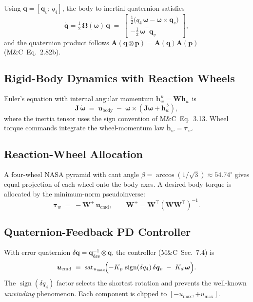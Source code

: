 Using \(\bm{q}=[\bm{q}_v;\,q_4]\), the body-to-inertial quaternion satisfies
\begin{equation}
\dot{\bm{q}} = \tfrac{1}{2}\,\bm{\Omega}(\bm{\omega})\,\bm{q}
\;=\;
\begin{bmatrix}
 \tfrac{1}{2}\bigl(q_4\,\bm{\omega} - \bm{\omega}\times\bm{q}_v\bigr) \\
-\tfrac{1}{2}\,\bm{\omega}^{\!\top}\bm{q}_v
\end{bmatrix},
\tag{M\&C Eq.~2.88}
\end{equation}
and the quaternion product follows
\(\bm{A}(\bm{q}\otimes\bm{p}) = \bm{A}(\bm{q})\bm{A}(\bm{p})\)
(M\&C~Eq.~2.82b).

\subsection{Rigid-Body Dynamics with Reaction Wheels}

Euler's equation with internal angular momentum
\(\bm{h}_w^{\,b} = \bm{W}\bm{h}_w\) is
\begin{equation}
\bm{J}\,\dot{\bm{\omega}}
\;=\;
\bm{u}_{\text{body}}
\;-\;
\bm{\omega}\times(\bm{J}\bm{\omega} + \bm{h}_w^{\,b}),
\tag{M\&C Sec.~7.2}
\end{equation}
where the inertia tensor uses the sign convention of M\&C~Eq.~3.13.
Wheel torque commands integrate the wheel-momentum law
\(\dot{\bm{h}}_w = \bm{\tau}_w\).

\subsection{Reaction-Wheel Allocation}

A four-wheel NASA pyramid with cant angle \(\beta = \arccos(1/\sqrt{3})
\approx 54.74^\circ\) gives equal projection of each wheel onto the body
axes. A desired body torque is allocated by the minimum-norm pseudoinverse:
\begin{equation}
\bm{\tau}_w \;=\; -\bm{W}^{+}\,\bm{u}_{\text{cmd}},
\qquad
\bm{W}^{+} = \bm{W}^{\!\top}(\bm{W}\bm{W}^{\!\top})^{-1}.
\end{equation}

\subsection{Quaternion-Feedback PD Controller}

With error quaternion \(\delta\bm{q} = \bm{q}_{\text{des}}^{-1}\otimes\bm{q}\),
the controller (M\&C~Sec.~7.4) is
\begin{equation}
\bm{u}_{\text{cmd}} \;=\;
\operatorname{sat}_{u_{\max}}\!\Bigl(
 -K_p\,\operatorname{sign}(\delta q_4)\,\delta\bm{q}_v
 \;-\; K_d\,\bm{\omega}
\Bigr).
\end{equation}
The \(\operatorname{sign}(\delta q_4)\) factor selects the shortest rotation
and prevents the well-known \emph{unwinding} phenomenon. Each component is
clipped to \([-u_{\max},+u_{\max}]\).

